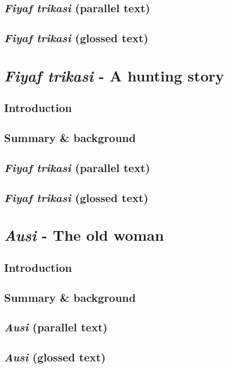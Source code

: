 \documentclass[output=book,
		  ]{langscibook}
\begin{document}
\section{\textit{Fiyaf trikasi} (parallel text)}
    
    \newpage
\section{\textit{Fiyaf trikasi} (glossed text)}
    

\chapter{\textit{Fiyaf trikasi} - A hunting story}\label{text:fiyaf-maembu}
\section{Introduction}
    
\section{Summary \& background}
    
\section{\textit{Fiyaf trikasi} (parallel text)}
    
    \newpage
\section{\textit{Fiyaf trikasi} (glossed text)}
    

\chapter{\textit{Ausi} - The old woman}\label{text:ausi}
    \section{Introduction}
    
\section{Summary \& background}
    
\section{\textit{Ausi} (parallel text)}
    
    \newpage
\section{\textit{Ausi} (glossed text)}
    



\end{document}
